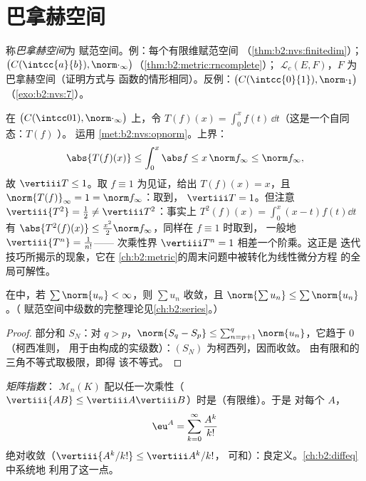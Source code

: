 \section{巴拿赫空间}

\begin{definition}\label{def:b2:nvs:banach}
称\emph{巴拿赫空间}为
赋范空间。例：每个有限维赋范空间
（\cref{thm:b2:nvs:finitedim}）；$\bigl(C(\intcc{a}{b}),
\norm\cdot_\infty\bigr)$（\cref{thm:b2:metric:rncomplete}）；
$\mathcal{L}_c(E, F)$，$F$ 为巴拿赫空间（证明方式与
函数的情形相同）。反例：$\bigl(C(\intcc{0}{1}),
\norm\cdot_1\bigr)$（\cref{exo:b2:nvs:7}）。
\end{definition}

\begin{example}[积分的算子范数]\label{ex:b2:nvs:integrationnorm}
在 $\bigl(C(\intcc01), \norm\cdot_\infty\bigr)$ 上，令 $T(f)(x) =
\int_0^x f(t)\,\dd t$（这是一个自同态：$T(f)$ ）。
运用 \cref{met:b2:nvs:opnorm}。上界：
\[
\abs{T(f)(x)} \leq \int_0^x\abs f \leq x\,\norm f_\infty \leq
\norm f_\infty ,
\]
故 $\vertiii T \leq 1$。取 $f \equiv 1$ 为见证，给出 $T(f)(x) =
x$，且 $\norm{T(f)}_\infty = 1 = \norm f_\infty$：取到，
$\vertiii T = 1$。但注意 $\vertiii{T^2} = \frac12 \neq
\vertiii T^2$：事实上 $T^2(f)(x) = \int_0^x(x - t)f(t)\dd t$ 有
$\abs{T^2(f)(x)} \leq \frac{x^2}2\norm f_\infty$，同样在 $f \equiv 1$ 时取到，
一般地 $\vertiii{T^n} = \frac1{n!}$——
次乘性界 $\vertiii T^n = 1$ 相差一个阶乘。这正是
迭代技巧所揭示的现象，它在
\cref{ch:b2:metric}的周末问题中被转化为线性微分方程
的全局可解性。
\end{example}

\begin{theorem}[巴拿赫空间中的绝对收敛]\label{thm:b2:nvs:absoluteconvergence}
在中，若 $\sum \norm{u_n} < \infty$，则 $\sum u_n$
收敛，且 $\norm{\sum u_n} \leq \sum\norm{u_n}$。（
赋范空间中级数的完整理论见\cref{ch:b2:series}。）
\end{theorem}

\begin{proof}
部分和 $S_N$：对 $q > p$，$\norm{S_q - S_p} \leq
\sum_{n=p+1}^{q}\norm{u_n}$，它趋于 $0$（柯西准则，
用于由构成的实级数）：$(S_N)$ 为柯西列，因而收敛。
由有限和的三角不等式取极限，即得
该不等式。
\end{proof}

\begin{example}[矩阵指数初探]\label{ex:b2:nvs:matrixexp}
\emph{矩阵指数}：
$\mathcal{M}_n(K)$ 配以任一次乘性（$\vertiii{AB}
\leq \vertiii A \vertiii B$）时是（有限维）。于是
对每个 $A$，
\[
\eu^A = \sum_{k=0}^{\infty} \frac{A^k}{k!}
\]
绝对收敛（$\vertiii{A^k/k!} \leq \vertiii A^k /k!$，
可和）：良定义。\cref{ch:b2:diffeq}中系统地
利用了这一点。
\end{example}

